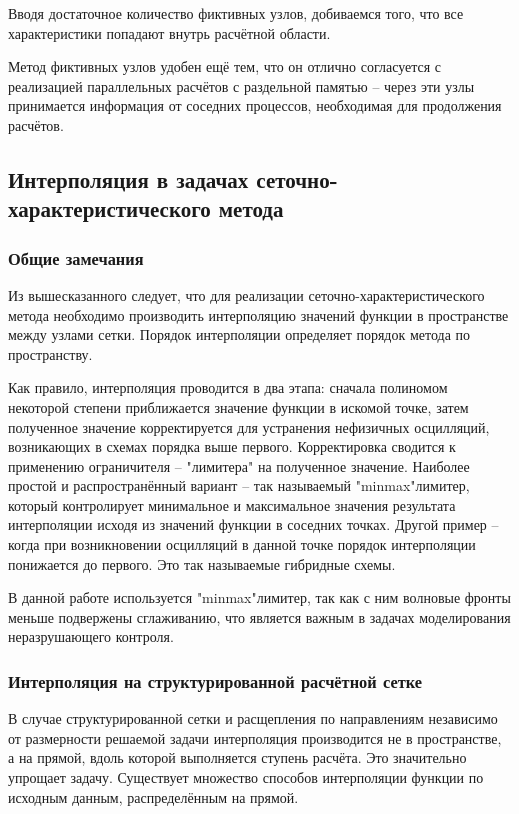 Вводя достаточное количество фиктивных узлов, добиваемся того, что все характеристики попадают внутрь расчётной области.

Метод фиктивных узлов удобен ещё тем, что он отлично согласуется с реализацией параллельных расчётов с раздельной памятью -- через эти узлы принимается информация от соседних процессов, необходимая для продолжения расчётов.


\subsection{Интерполяция в задачах сеточно\hyp{}характеристического метода}
\subsubsection{Общие замечания}
Из вышесказанного следует, что для реализации сеточно\hyp{}характеристического метода необходимо производить интерполяцию значений функции в пространстве между узлами сетки. Порядок интерполяции определяет порядок метода по пространству. 

Как правило, интерполяция проводится в два этапа: сначала полиномом некоторой степени приближается значение функции в искомой точке, затем полученное значение корректируется для устранения нефизичных осцилляций, возникающих в схемах порядка выше первого. Корректировка сводится к применению ограничителя -- "лимитера"\space{} на полученное значение. Наиболее простой и распространённый вариант -- так называемый "minmax"\space{}лимитер, который контролирует минимальное и максимальное значения результата интерполяции исходя из значений функции в соседних точках. Другой пример -- когда при возникновении осцилляций в данной точке порядок интерполяции понижается до первого. Это так называемые гибридные схемы.

В данной работе используется "minmax"\space{}лимитер, так как с ним волновые фронты меньше подвержены сглаживанию, что является важным в задачах моделирования неразрушающего контроля.

\subsubsection{Интерполяция на структурированной расчётной сетке}
В случае структурированной сетки и расщепления по направлениям независимо от размерности решаемой задачи интерполяция производится не в пространстве, а на прямой, вдоль которой выполняется ступень расчёта. Это значительно упрощает задачу. Существует множество способов интерполяции функции по исходным данным, распределённым на прямой. 

